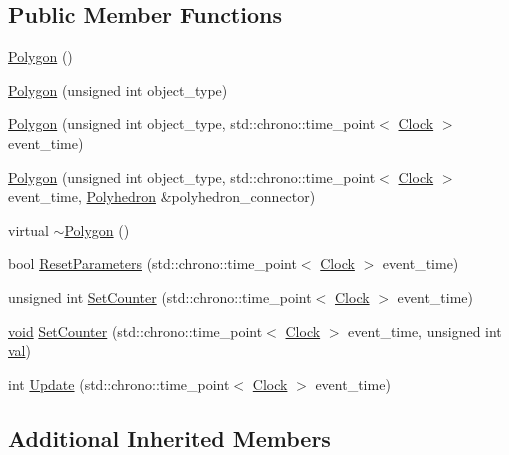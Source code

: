 \subsection*{Public Member Functions}
\begin{DoxyCompactItemize}
\item 
\mbox{\hyperlink{class_polygon_ac183e712f8be1e13f1c9d5b4d4512ead}{Polygon}} ()
\item 
\mbox{\hyperlink{class_polygon_a023fe85caf3682e46fb6d15d03da3435}{Polygon}} (unsigned int object\+\_\+type)
\item 
\mbox{\hyperlink{class_polygon_aa2a7d4a8a7765c45b834a7ecc198e0c3}{Polygon}} (unsigned int object\+\_\+type, std\+::chrono\+::time\+\_\+point$<$ \mbox{\hyperlink{universe_8h_a0ef8d951d1ca5ab3cfaf7ab4c7a6fd80}{Clock}} $>$ event\+\_\+time)
\item 
\mbox{\hyperlink{class_polygon_a581ad88f80bf40668e6c8b928c908bcb}{Polygon}} (unsigned int object\+\_\+type, std\+::chrono\+::time\+\_\+point$<$ \mbox{\hyperlink{universe_8h_a0ef8d951d1ca5ab3cfaf7ab4c7a6fd80}{Clock}} $>$ event\+\_\+time, \mbox{\hyperlink{class_polyhedron}{Polyhedron}} \&polyhedron\+\_\+connector)
\item 
virtual \mbox{\hyperlink{class_polygon_a873f9acee059f717277b6414102dab16}{$\sim$\+Polygon}} ()
\item 
bool \mbox{\hyperlink{class_polygon_a0e2824d12cd6b18c8b14c64ef4b2bf97}{Reset\+Parameters}} (std\+::chrono\+::time\+\_\+point$<$ \mbox{\hyperlink{universe_8h_a0ef8d951d1ca5ab3cfaf7ab4c7a6fd80}{Clock}} $>$ event\+\_\+time)
\item 
unsigned int \mbox{\hyperlink{class_polygon_a344626b07ee8dc40c71c3bec1480d2c2}{Set\+Counter}} (std\+::chrono\+::time\+\_\+point$<$ \mbox{\hyperlink{universe_8h_a0ef8d951d1ca5ab3cfaf7ab4c7a6fd80}{Clock}} $>$ event\+\_\+time)
\item 
\mbox{\hyperlink{glad_8h_a950fc91edb4504f62f1c577bf4727c29}{void}} \mbox{\hyperlink{class_polygon_ad12083d8c152a1979b04bead93b6b730}{Set\+Counter}} (std\+::chrono\+::time\+\_\+point$<$ \mbox{\hyperlink{universe_8h_a0ef8d951d1ca5ab3cfaf7ab4c7a6fd80}{Clock}} $>$ event\+\_\+time, unsigned int \mbox{\hyperlink{glad_8h_a26942fd2ed566ef553eae82d2c109c8f}{val}})
\item 
int \mbox{\hyperlink{class_polygon_ab3fe58d8ffce2e16589958def88aa188}{Update}} (std\+::chrono\+::time\+\_\+point$<$ \mbox{\hyperlink{universe_8h_a0ef8d951d1ca5ab3cfaf7ab4c7a6fd80}{Clock}} $>$ event\+\_\+time)
\end{DoxyCompactItemize}
\subsection*{Additional Inherited Members}



